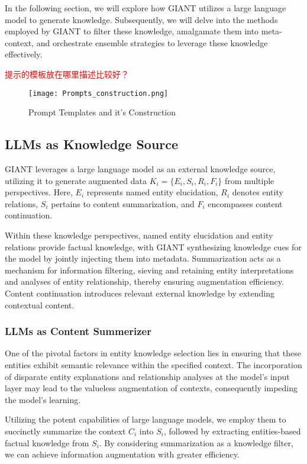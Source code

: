  In the following section, we will explore how GIANT utilizes a large language model to generate knowledge. Subsequently, we will delve into the methods employed by GIANT to filter these knowledge, amalgamate them into meta-context, and orchestrate ensemble strategies to leverage these knowledge effectively.

\textcolor{red}{提示的模板放在哪里描述比较好？}
\label{sec:prompt_construction}
\begin{figure*}[h]
	\centering
	\texttt{[image: Prompts\_construction.png]}
	\caption{Prompt Templates and it's Construction}
	\label{fig:prompt_template}
\end{figure*}   

\subsection{LLMs as Knowledge Source}
 GIANT leverages a large language model as an external knowledge source, utilizing it to generate augmented data $K_i = \{E_i, S_i, R_i, F_i\}$ from multiple perspectives. Here, $E_i$ represents named entity elucidation, $R_i$ denotes entity relations, $S_i$ pertains to content summarization, and $F_i$ encompasses content continuation.

 Within these knowledge perspectives, named entity elucidation and entity relations provide factual knowledge, with GIANT synthesizing knowledge cues for the model by jointly injecting them into metadata.
 Summarization acts as a mechanism for information filtering, sieving and retaining entity interpretations and analyses of entity relationship, thereby ensuring augmentation efficiency. 
 Content continuation introduces relevant external knowledge by extending contextual content.
 
\subsubsection{LLMs as Content Summerizer}
 One of the pivotal factors in entity knowledge selection lies in ensuring that these entities exhibit semantic relevance within the specified context. The incorporation of disparate entity explanations and relationship analyses at the model's input layer may lead to the valueless augmentation of contexts, consequently impeding the model's learning.
 
 Utilizing the potent capabilities of large language models, we employ them to succinctly summarize the context $C_i$ into $S_i$, followed by extracting entities-based factual knowledge from $S_i$.
 By considering summarization as a knowledge filter, we can achieve information augmentation with greater efficiency.
 
